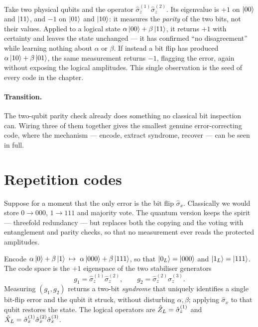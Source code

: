 \begin{example}
\label{ex:parity-check}
Take two physical qubits and the operator
$\hat\sigma_z^{(1)}\hat\sigma_z^{(2)}$. Its eigenvalue is $+1$ on
$\ket{00}$ and $\ket{11}$, and $-1$ on $\ket{01}$ and $\ket{10}$: it
measures the \emph{parity} of the two bits, not their values. Applied to
a logical state $\alpha\ket{00}+\beta\ket{11}$, it returns $+1$ with
certainty and leaves the state unchanged --- it has confirmed ``no
disagreement'' while learning nothing about $\alpha$ or $\beta$. If
instead a bit flip has produced $\alpha\ket{10}+\beta\ket{01}$, the same
measurement returns $-1$, flagging the error, again without exposing the
logical amplitudes. This single observation is the seed of every code in
the chapter.
\end{example}

\paragraph{Transition.}
The two-qubit parity check already does something no classical bit
inspection can. Wiring three of them together gives the smallest genuine
error-correcting code, where the mechanism --- encode, extract syndrome,
recover --- can be seen in full.

\section{Repetition codes}
\label{sec:repetition}

\begin{phenomenon}
Suppose for a moment that the only error is the bit flip
$\hat\sigma_x$. Classically we would store $0\to000$, $1\to111$ and
majority vote. The quantum version keeps the spirit --- threefold
redundancy --- but replaces both the copying and the voting with
entanglement and parity checks, so that no measurement ever reads the
protected amplitudes.
\end{phenomenon}

\begin{statement}
\label{stmt:repetition}
Encode $\alpha\ket{0}+\beta\ket{1}\;\mapsto\;
\alpha\ket{000}+\beta\ket{111}$, so that
$\ket{0_L}=\ket{000}$ and $\ket{1_L}=\ket{111}$. The code space is the
$+1$ eigenspace of the two stabiliser generators
\begin{equation}
g_1=\hat\sigma_z^{(1)}\hat\sigma_z^{(2)},
\qquad
g_2=\hat\sigma_z^{(2)}\hat\sigma_z^{(3)}.
\end{equation}
Measuring $(g_1,g_2)$ returns a two-bit \emph{syndrome} that uniquely
identifies a single bit-flip error and the qubit it struck, without
disturbing $\alpha,\beta$; applying $\hat\sigma_x$ to that qubit
restores the state. The logical operators are
$\hat{Z}_L=\hat\sigma_z^{(1)}$ and
$\hat{X}_L=\hat\sigma_x^{(1)}\hat\sigma_x^{(2)}\hat\sigma_x^{(3)}$.
\end{statement}

